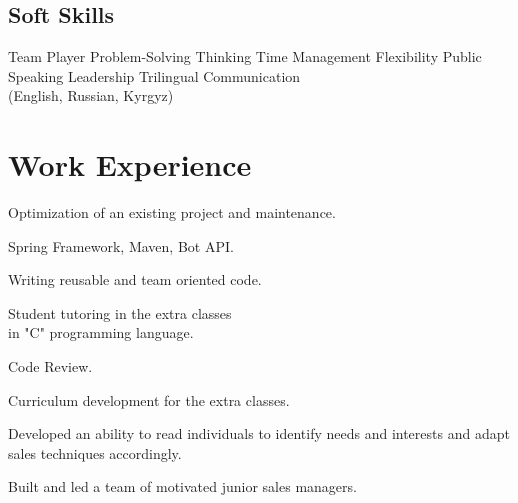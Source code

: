 \documentclass[]{deedy-resume-openfont}
\begin{document}
\begin{minipage}[t]{0.40\textwidth}
\subsection{Soft Skills}
 Team Player \textbullet{} Problem-Solving Thinking \textbullet{} Time Management \textbullet{} Flexibility \textbullet{} Public Speaking \textbullet{} Leadership \textbullet{} Trilingual Communication\\ (English, Russian, Kyrgyz)


\section{Work Experience}


\begin{tightemize}
\vspace{\topsep} %
\item Optimization of an existing project and maintenance.
\item Spring Framework, Maven, Bot API.
\item Writing reusable and team oriented code.

\end{tightemize}
\sectionsep


\begin{tightemize}
\item Student tutoring in the extra classes\\ in "C" programming language.
\item Code Review.
\item Curriculum development for the extra classes.

\end{tightemize}
\sectionsep




\begin{tightemize}
\item Developed an ability to read individuals to identify needs and interests and adapt sales techniques accordingly.
\item Built and led a team of motivated junior sales managers.
\end{tightemize}






\end{minipage}
\end{document}
